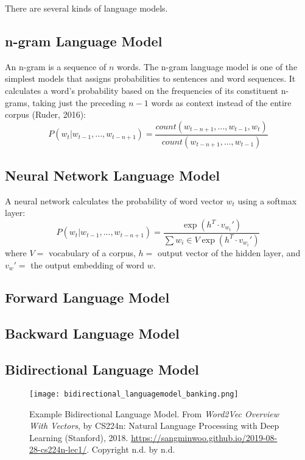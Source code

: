 There are several kinds of language models. 

\subsection{n-gram Language Model}

An n-gram is a sequence of $n$ words. The n-gram language model is one of the simplest models that assigns probabilities to sentences and word sequences. It calculates a word's probability based on the frequencies of its constituent n-grams, taking just the preceding $n-1$ words as context instead of the entire corpus (Ruder, 2016): 
$$
P(w_t | w_{t-1}, ..., w_{t-n+1}) = \frac {count(w_{t-n+1},...,w_{t-1},w_t)} {count(w_{t-n+1},...,w_{t-1})}
$$

\subsection{Neural Network Language Model}

A neural network calculates the probability of word vector $w_t$ using a softmax layer: 
$$
P(w_t | w_{t-1}, ..., w_{t-n+1}) = \frac {\exp{(h^T \cdot v_{w_t}') }} {\sum{w_i \in V} \exp{(h^T \cdot v_{w_i}') }}
$$
where $V = $ vocabulary of a corpus, $h = $ output vector of the hidden layer, and $v_w' = $ the output embedding of word $w$. 

\subsection{Forward Language Model}

\subsection{Backward Language Model}

\subsection{Bidirectional Language Model}

\begin{figure}[h]
\centering
\texttt{[image: bidirectional\_languagemodel\_banking.png]}
\caption{Example Bidirectional Language Model. From \emph{Word2Vec Overview With Vectors}, by CS224n: Natural Language Processing with Deep Learning (Stanford), 2018. \url{https://sangminwoo.github.io/2019-08-28-cs224n-lec1/}. Copyright n.d. by n.d.}
\end{figure}



